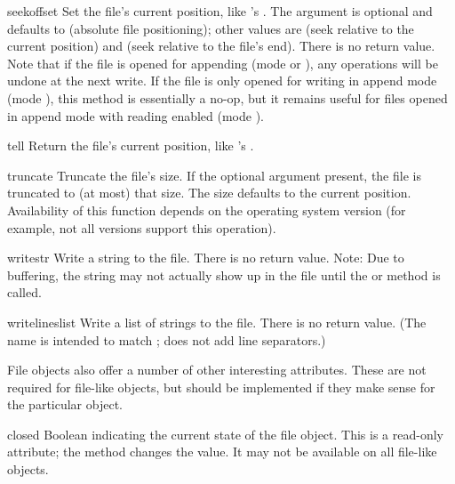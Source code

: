 \begin{methoddesc}[file]{seek}{offset}
  Set the file's current position, like 's .
  The  argument is optional and defaults to 
  (absolute file positioning); other values are  (seek
  relative to the current position) and  (seek relative to the
  file's end).  There is no return value.  Note that if the file is
  opened for appending (mode  or ), any
   operations will be undone at the next write.  If the
  file is only opened for writing in append mode (mode ),
  this method is essentially a no-op, but it remains useful for files
  opened in append mode with reading enabled (mode ).
\end{methoddesc}

\begin{methoddesc}[file]{tell}{}
  Return the file's current position, like 's
  .
\end{methoddesc}

\begin{methoddesc}[file]{truncate}{}
  Truncate the file's size.  If the optional  argument
  present, the file is truncated to (at most) that size.  The size
  defaults to the current position.  Availability of this function
  depends on the operating system version (for example, not all
  \UNIX{} versions support this operation).
\end{methoddesc}

\begin{methoddesc}[file]{write}{str}
  Write a string to the file.  There is no return value.  Note: Due to
  buffering, the string may not actually show up in the file until
  the  or  method is called.
\end{methoddesc}

\begin{methoddesc}[file]{writelines}{list}
  Write a list of strings to the file.  There is no return value.
  (The name is intended to match ;
   does not add line separators.)
\end{methoddesc}


File objects also offer a number of other interesting attributes.
These are not required for file-like objects, but should be
implemented if they make sense for the particular object.

\begin{memberdesc}[file]{closed}
Boolean indicating the current state of the file object.  This is a
read-only attribute; the  method changes the value.
It may not be available on all file-like objects.
\end{memberdesc}

